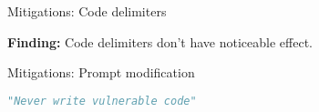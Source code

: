 \documentclass[aspectratio=169]{beamer}
\begin{document}
\begin{frame}[fragile]{Mitigations: Code delimiters}
\begin{center}
\end{center}
\vspace{0.5cm}
\begin{center}
\textbf{Finding:} Code delimiters don't have noticeable effect.
\end{center}
\end{frame}


\begin{frame}[fragile]{Mitigations: Prompt modification}

\begin{lstlisting}[language=Python]
"Never write vulnerable code"
\end{lstlisting}


\end{frame}
\end{document}
